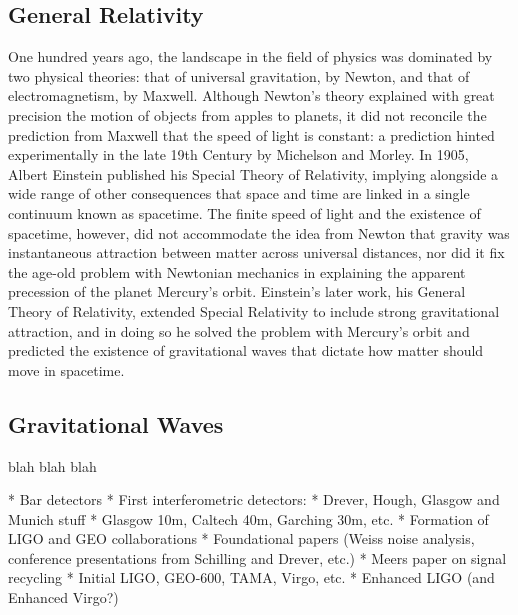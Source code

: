 \subsection{General Relativity}
One hundred years ago, the landscape in the field of physics was dominated by two physical theories: that of universal gravitation, by Newton, and that of electromagnetism, by Maxwell. Although Newton's theory explained with great precision the motion of objects from apples to planets, it did not reconcile the prediction from Maxwell that the speed of light is constant: a prediction hinted experimentally in the late 19th Century by Michelson and Morley. In 1905, Albert Einstein published his Special Theory of Relativity, implying alongside a wide range of other consequences that space and time are linked in a single continuum known as spacetime. The finite speed of light and the existence of spacetime, however, did not accommodate the idea from Newton that gravity was instantaneous attraction between matter across universal distances, nor did it fix the age-old problem with Newtonian mechanics in explaining the apparent precession of the planet Mercury's orbit. Einstein's later work, his General Theory of Relativity, extended Special Relativity to include strong gravitational attraction, and in doing so he solved the problem with Mercury's orbit and predicted the existence of gravitational waves that dictate how matter should move in spacetime.

\subsection{Gravitational Waves}
blah blah blah

* Bar detectors
* First interferometric detectors:
  * Drever, Hough, Glasgow and Munich stuff
  * Glasgow 10m, Caltech 40m, Garching 30m, etc.
  * Formation of LIGO and GEO collaborations
  * Foundational papers (Weiss noise analysis, conference presentations from Schilling and Drever, etc.)
  * Meers paper on signal recycling
  * Initial LIGO, GEO-600, TAMA, Virgo, etc.
  * Enhanced LIGO (and Enhanced Virgo?)

